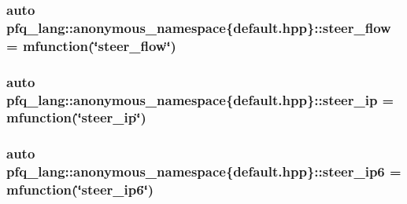 \hypertarget{namespacepfq__lang_1_1anonymous__namespace_02default_8hpp_03_aee7b4eb8c316f9c0cd6ee7bc22b517ef}{
\subsubsection[{steer\+\_\+flow}]{\setlength{\rightskip}{0pt plus 5cm}auto pfq\+\_\+lang\+::anonymous\+\_\+namespace\{default.\+hpp\}\+::steer\+\_\+flow = {\bf mfunction}(\char`\"{}steer\+\_\+flow\char`\"{})}}\label{namespacepfq__lang_1_1anonymous__namespace_02default_8hpp_03_aee7b4eb8c316f9c0cd6ee7bc22b517ef}
\hypertarget{namespacepfq__lang_1_1anonymous__namespace_02default_8hpp_03_ab44cbea49db522460c5bce82d04280cd}{
\subsubsection[{steer\+\_\+ip}]{\setlength{\rightskip}{0pt plus 5cm}auto pfq\+\_\+lang\+::anonymous\+\_\+namespace\{default.\+hpp\}\+::steer\+\_\+ip = {\bf mfunction}(\char`\"{}steer\+\_\+ip\char`\"{})}}\label{namespacepfq__lang_1_1anonymous__namespace_02default_8hpp_03_ab44cbea49db522460c5bce82d04280cd}
\hypertarget{namespacepfq__lang_1_1anonymous__namespace_02default_8hpp_03_a011de504f63578469615a302f823d238}{
\subsubsection[{steer\+\_\+ip6}]{\setlength{\rightskip}{0pt plus 5cm}auto pfq\+\_\+lang\+::anonymous\+\_\+namespace\{default.\+hpp\}\+::steer\+\_\+ip6 = {\bf mfunction}(\char`\"{}steer\+\_\+ip6\char`\"{})}}\label{namespacepfq__lang_1_1anonymous__namespace_02default_8hpp_03_a011de504f63578469615a302f823d238}
